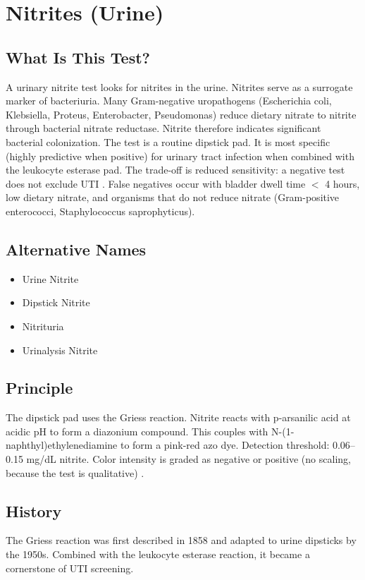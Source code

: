 \chapter{Nitrites (Urine)}

\section*{What Is This Test?}
A urinary nitrite test looks for nitrites in the urine. Nitrites serve as a surrogate marker of bacteriuria. Many Gram-negative uropathogens (Escherichia coli, Klebsiella, Proteus, Enterobacter, Pseudomonas) reduce dietary nitrate to nitrite through bacterial nitrate reductase. Nitrite therefore indicates significant bacterial colonization. The test is a routine dipstick pad. It is most specific (highly predictive when positive) for urinary tract infection when combined with the leukocyte esterase pad. The trade-off is reduced sensitivity: a negative test does not exclude UTI \cite{deville2004urine}. False negatives occur with bladder dwell time $<$ 4 hours, low dietary nitrate, and organisms that do not reduce nitrate (Gram-positive enterococci, Staphylococcus saprophyticus).

\section*{Alternative Names}
\begin{itemize}
  \item Urine Nitrite
  \item Dipstick Nitrite
  \item Nitrituria
  \item Urinalysis Nitrite
\end{itemize}
\section*{Principle}
The dipstick pad uses the Griess reaction. Nitrite reacts with p-arsanilic acid at acidic pH to form a diazonium compound. This couples with N-(1-naphthyl)ethylenediamine to form a pink-red azo dye. Detection threshold: 0.06--0.15 mg/dL nitrite. Color intensity is graded as negative or positive (no scaling, because the test is qualitative) \cite{strasinger2020urinalysis}.

\section*{History}
The Griess reaction was first described in 1858 and adapted to urine dipsticks by the 1950s. Combined with the leukocyte esterase reaction, it became a cornerstone of UTI screening.

